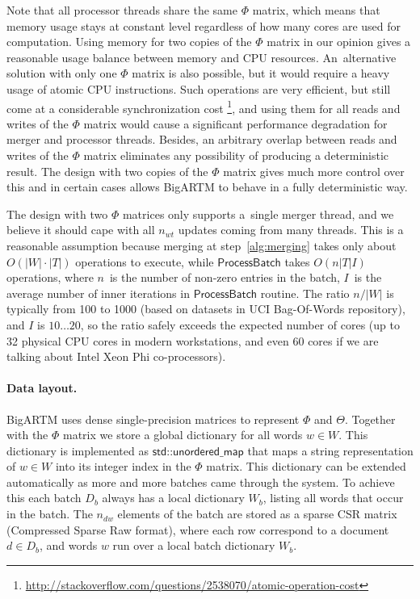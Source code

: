 \documentclass{llncs}
\newcommand{\kw}[1]{\textsf{#1}}
\begin{document}
Note that all processor threads share the same $\Phi$ matrix,
which means that memory usage stays at constant level regardless of how many cores are used for computation.
Using memory for two copies of the $\Phi$ matrix in our opinion gives a reasonable usage balance between memory and CPU resources.
An~alternative solution with only one $\Phi$ matrix is also possible, but it would require a heavy usage of atomic CPU instructions.
Such operations are very efficient, but still come at a considerable synchronization cost%
\footnote{\url{http://stackoverflow.com/questions/2538070/atomic-operation-cost}},
and using them for all reads and writes of the $\Phi$ matrix would cause a significant performance degradation for merger and processor threads.
Besides, an arbitrary overlap between reads and writes of the $\Phi$ matrix eliminates any possibility of producing a deterministic result.
The design with two copies of the $\Phi$ matrix gives much more control over this
and in certain cases allows BigARTM to behave in a fully deterministic way.

The design with two $\Phi$ matrices only supports a~single merger thread,
and we believe it should cape with all $n_{wt}$ updates coming from many threads.
This is a reasonable assumption because
merging at step~\ref{alg:merging} takes only about $O(|W|\cdot|T|)$ operations to execute, while
$\kw{ProcessBatch}$ takes $O(n |T| I)$ operations,
where
$n$~is the number of non-zero entries in the batch,
$I$~is the average number of inner iterations in $\kw{ProcessBatch}$ routine.
The ratio $n / |W|$ is typically from 100 to 1000 (based on datasets in UCI Bag-Of-Words repository),
and $I$ is $10 \dots 20$, so the ratio safely exceeds the expected number of cores
(up to 32 physical CPU cores in modern workstations, and even 60 cores if we are talking about Intel Xeon Phi co-processors).

\paragraph{Data layout.}
BigARTM uses dense single-precision matrices to represent $\Phi$ and $\Theta$.
Together with the $\Phi$ matrix we store a global dictionary for all words $w \in W$.
This dictionary is implemented as $\kw{std::unordered\_map}$ that maps a string representation of $w \in W$
into its integer index in the $\Phi$ matrix.
This dictionary can be extended automatically as more and more batches came through the system.
To achieve this each batch $D_b$ always has a local dictionary $W_b$, listing all words that occur in the batch.
The $n_{dw}$ elements of the batch are stored as a sparse CSR matrix (Compressed Sparse Raw format),
where each row correspond to a document $d \in D_b$, and words $w$ run over a local batch dictionary $W_b$.
\end{document}

